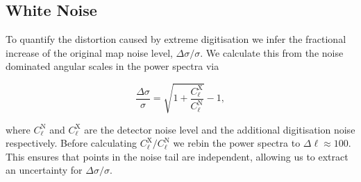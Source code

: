 \documentclass[apj]{emulateapj}
\begin{document}
\subsection{White Noise}
\label{subsec:whitenoise}

To quantify the distortion caused by extreme digitisation we infer the fractional increase of the original map noise level, $\Delta \sigma / \sigma$. We calculate this from the noise dominated angular scales in the power spectra via

\begin{equation}
\frac{\Delta \sigma}{\sigma} = \sqrt{1 + \frac{C_\ell^\mathrm{X}}{C_\ell^{\mathrm{N}}}} - 1,
\end{equation}

where $C_\ell^{\mathrm{N}}$ and $C_\ell^\mathrm{X}$ are the detector noise level and the additional digitisation noise respectively. Before calculating $C_\ell^\mathrm{X}/C_\ell^\mathrm{N}$ we rebin the power spectra to $\Delta \ell \approx 100$. This ensures that points in the noise tail are independent, allowing us to extract an uncertainty for $\Delta \sigma / \sigma$.






\end{document}
